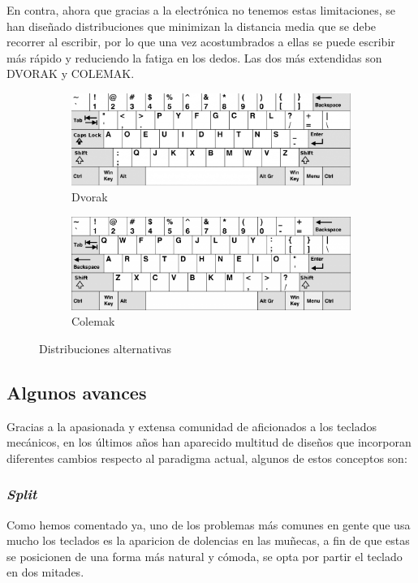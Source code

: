   En contra, ahora que gracias a la electrónica no tenemos estas limitaciones, se han diseñado distribuciones que minimizan la distancia media que se debe recorrer al escribir, por lo que una vez acostumbrados a ellas se puede escribir más rápido y reduciendo la fatiga en los dedos. Las dos más extendidas son DVORAK y COLEMAK. 
  \begin{figure}[H]
    \begin{subfigure}[b]{.5\textwidth}
      \centering
      \includegraphics[width=.6\textwidth]{images/dvorak}
      \caption{Dvorak}
    \end{subfigure} 
    \hfill
    \begin{subfigure}[b]{.5\textwidth}
      \centering
      \includegraphics[width=.6\textwidth]{images/colemak}
      \caption{Colemak}
    \end{subfigure}
    \caption{Distribuciones alternativas}
  \end{figure}

\subsection{Algunos avances}
Gracias a la apasionada y extensa comunidad de aficionados a los teclados mecánicos, en los últimos años han aparecido multitud de diseños que incorporan diferentes cambios respecto al paradigma actual, algunos de estos conceptos son:
  \subsubsection{\textit{Split}}
  Como hemos comentado ya, uno de los problemas más comunes en gente que usa mucho los teclados es la aparicion de dolencias en las muñecas, a fin de que estas se posicionen de una forma más natural y cómoda, se opta por partir el teclado en dos mitades.
  
